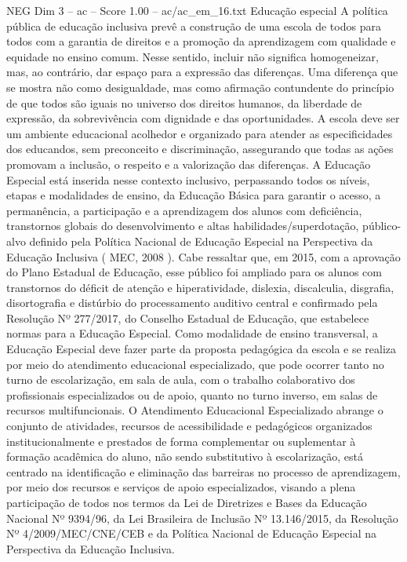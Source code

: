 \begin{textsample}{NEG Dim 3 – ac – Score 1.00 – ac/ac\_em\_16.txt}
Educação especial A política pública de educação inclusiva prevê a construção de uma escola de todos para todos com a garantia de direitos e a promoção da aprendizagem com qualidade e equidade no ensino comum.
Nesse sentido, incluir não significa homogeneizar, mas, ao contrário, dar espaço para a expressão das diferenças.
Uma diferença que se mostra não como desigualdade, mas como afirmação contundente do princípio de que todos são iguais no universo dos direitos humanos, da liberdade de expressão, da sobrevivência com dignidade e das oportunidades.
A escola deve ser um ambiente educacional acolhedor e organizado para atender as especificidades dos educandos, sem preconceito e discriminação, assegurando que todas as ações promovam a inclusão, o respeito e a valorização das diferenças.
A Educação Especial está inserida nesse contexto inclusivo, perpassando todos os níveis, etapas e modalidades de ensino, da Educação Básica para garantir o acesso, a permanência, a participação e a aprendizagem dos alunos com deficiência, transtornos globais do desenvolvimento e altas habilidades/superdotação, público-alvo definido pela Política Nacional de Educação Especial na Perspectiva da Educação Inclusiva ( MEC, 2008 ).
Cabe ressaltar que, em 2015, com a aprovação do Plano Estadual de Educação, esse público foi ampliado para os alunos com transtornos do déficit de atenção e hiperatividade, dislexia, discalculia, disgrafia, disortografia e distúrbio do processamento auditivo central e confirmado pela Resolução Nº 277/2017, do Conselho Estadual de Educação, que estabelece normas para a Educação Especial.
Como modalidade de ensino transversal, a Educação Especial deve fazer parte da proposta pedagógica da escola e se realiza por meio do atendimento educacional especializado, que pode ocorrer tanto no turno de escolarização, em sala de aula, com o trabalho colaborativo dos profissionais especializados ou de apoio, quanto no turno inverso, em salas de recursos multifuncionais.
O Atendimento Educacional Especializado abrange o conjunto de atividades, recursos de acessibilidade e pedagógicos organizados institucionalmente e prestados de forma complementar ou suplementar à formação acadêmica do aluno, não sendo substitutivo à escolarização, está centrado na identificação e eliminação das barreiras no processo de aprendizagem, por meio dos recursos e serviços de apoio especializados, visando a plena participação de todos nos termos da Lei de Diretrizes e Bases da Educação Nacional Nº 9394/96, da Lei Brasileira de Inclusão Nº 13.146/2015, da Resolução Nº 4/2009/MEC/CNE/CEB e da Política Nacional de Educação Especial na Perspectiva da Educação Inclusiva.

\end{textsample}
